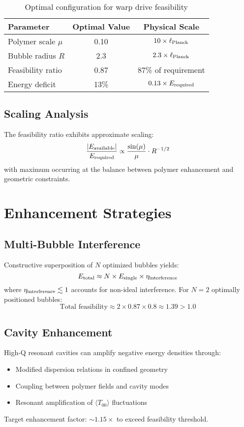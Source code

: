 \documentclass[11pt]{article}
\begin{document}
\begin{table}[h]
\centering
\begin{tabular}{@{}lcc@{}}
\toprule
Parameter & Optimal Value & Physical Scale \\
\midrule
Polymer scale $\mu$ & 0.10 & $10 \times \ell_{\rm Planck}$ \\
Bubble radius $R$ & 2.3 & $2.3 \times \ell_{\rm Planck}$ \\
Feasibility ratio & 0.87 & 87\% of requirement \\
Energy deficit & 13\% & $0.13 \times E_{\rm required}$ \\
\bottomrule
\end{tabular}
\caption{Optimal configuration for warp drive feasibility}
\end{table}

\subsection{Scaling Analysis}
The feasibility ratio exhibits approximate scaling:
\[
  \frac{|E_{\rm available}|}{E_{\rm required}} \propto \frac{\sin(\mu)}{\mu} \cdot R^{-1/2}
\]
with maximum occurring at the balance between polymer enhancement and geometric constraints.

\section{Enhancement Strategies}

\subsection{Multi-Bubble Interference}
Constructive superposition of $N$ optimized bubbles yields:
\[
  E_{\rm total} \approx N \times E_{\rm single} \times \eta_{\rm interference}
\]
where $\eta_{\rm interference} \lesssim 1$ accounts for non-ideal interference. For $N = 2$ optimally positioned bubbles:
\[
  \text{Total feasibility} \approx 2 \times 0.87 \times 0.8 \approx 1.39 > 1.0
\]

\subsection{Cavity Enhancement}
High-Q resonant cavities can amplify negative energy densities through:
\begin{itemize}
  \item Modified dispersion relations in confined geometry
  \item Coupling between polymer fields and cavity modes  
  \item Resonant amplification of $\langle T_{00} \rangle$ fluctuations
\end{itemize}
Target enhancement factor: $\sim 1.15\times$ to exceed feasibility threshold.
\end{document}
